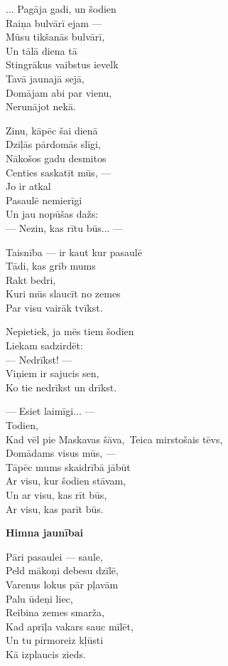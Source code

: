 \documentclass[14pt]{extarticle}
\begin{document}
{{... Pagāja gadi, un šodien\\
Raiņa bulvārī ejam ---\\
Mūsu tikšanās bulvārī,\\
Un tālā diena tā\\
Stingrākus vaibstus ievelk\\
Tavā jaunajā sejā,\\
Domājam abi par vienu,\\
Nerunājot nekā. 

Zinu, kāpēc šai dienā\\
Dziļās pārdomās slīgi,\\
Nākošos gadu desmitos\\
Centies saskatīt mūs, ---\\
Jo ir atkal\\
Pasaulē nemierīgi\\
Un jau nopūšas dažs:\\
--- Nezin, kas rītu būs... --- 

Taisnība --- ir kaut kur pasaulē\\
Tādi, kas grib mums\\
Rakt bedri,\\
Kuri mūs slaucīt no zemes\\
Par visu vairāk tvīkst.

Nepietiek, ja mēs tiem šodien\\
Liekam sadzirdēt:\\
--- Nedrīkst! ---\\
Viņiem ir sajucis sen,\\
Ko tie nedrīkst un drīkst. 

--- Esiet laimīgi... ---\\
Todien,\\
Kad vēl pie Maskavas šāva,\
Teica mirstošais tēvs,\\
Domādams visus mūs, --- \\
Tāpēc mums skaidrībā jābūt\\
Ar visu, kur šodien stāvam,\\
Un ar visu, kas rīt būs,\\
Ar visu, kas parīt būs. 


\newpage 

{\bf Himna jaunībai}

Pāri pasaulei --- saule,\\
Peld mākoņi debesu dzīlē,\\
Varenus lokus pār pļavām\\
Palu ūdeņi liec,\\
Reibina zemes smarža,\\
Kad aprīļa vakars sauc mīlēt,\\
Un tu pirmoreiz kļūsti\\
Kā izplaucis zieds.

}}
\end{document}

